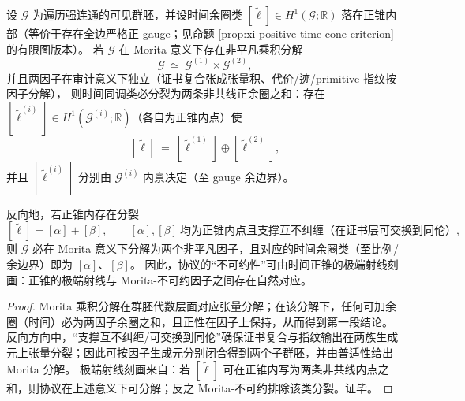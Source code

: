 \begin{theorem}\label{thm:xi-time-ray-prime-factorization-rigidity}
设 \(\mathcal G\) 为遍历强连通的可见群胚，并设时间余圈类 \([\widetilde\ell]\in H^1(\mathcal G;\mathbb R)\) 落在正锥内部（等价于存在全边严格正 gauge；见命题 \ref{prop:xi-positive-time-cone-criterion} 的有限图版本）。
若 \(\mathcal G\) 在 Morita 意义下存在非平凡乘积分解
\[
\mathcal G\ \simeq\ \mathcal G^{(1)}\times \mathcal G^{(2)},
\]
并且两因子在审计意义下独立（证书复合张成张量积、代价/迹/primitive 指纹按因子分解），
则时间同调类必分裂为两条非共线正余圈之和：存在 \([\widetilde\ell^{(i)}]\in H^1(\mathcal G^{(i)};\mathbb R)\)（各自为正锥内点）使
\[
[\widetilde\ell]\ =\ [\widetilde\ell^{(1)}]\oplus[\widetilde\ell^{(2)}],
\]
并且 \([\widetilde\ell^{(i)}]\) 分别由 \(\mathcal G^{(i)}\) 内禀决定（至 gauge 余边界）。
\par
反向地，若正锥内存在分裂
\[
[\widetilde\ell]=[\alpha]+[\beta],
\qquad
[\alpha],[\beta]\ \text{均为正锥内点且支撑互不纠缠（在证书层可交换到同伦）},
\]
则 \(\mathcal G\) 必在 Morita 意义下分解为两个非平凡因子，且对应的时间余圈类（至比例/余边界）即为 \([\alpha]\)、\([\beta]\)。
因此，协议的“不可约性”可由时间正锥的极端射线刻画：正锥的极端射线与 Morita-不可约因子之间存在自然对应。
\end{theorem}
\begin{proof}
Morita 乘积分解在群胚代数层面对应张量分解；在该分解下，任何可加余圈（时间）必为两因子余圈之和，且正性在因子上保持，从而得到第一段结论。
反向方向中，“支撑互不纠缠/可交换到同伦”确保证书复合与指纹输出在两族生成元上张量分裂；因此可按因子生成元分别闭合得到两个子群胚，并由普适性给出 Morita 分解。
极端射线刻画来自：若 \([\widetilde\ell]\) 可在正锥内写为两条非共线内点之和，则协议在上述意义下可分解；反之 Morita-不可约排除该类分裂。证毕。
\end{proof}

